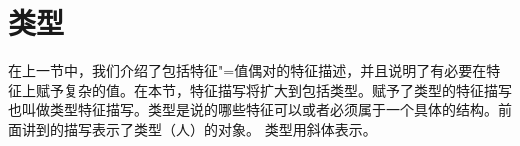 \section{类型}
\label{sec-formalismus-typen}

在上一节中，我们介绍了包括特征"=值偶对的特征描述，并且说明了有必要在特征上赋予复杂的值。在本节，特征描写将扩大到包括类型。赋予了类型的特征描写也叫做类型特征描写。类型是说的哪些特征可以或者必须属于一个具体的结构。前面讲到的描写表示了类型（人）的对象。
\ea
{}
\z
类型用斜体表示。

